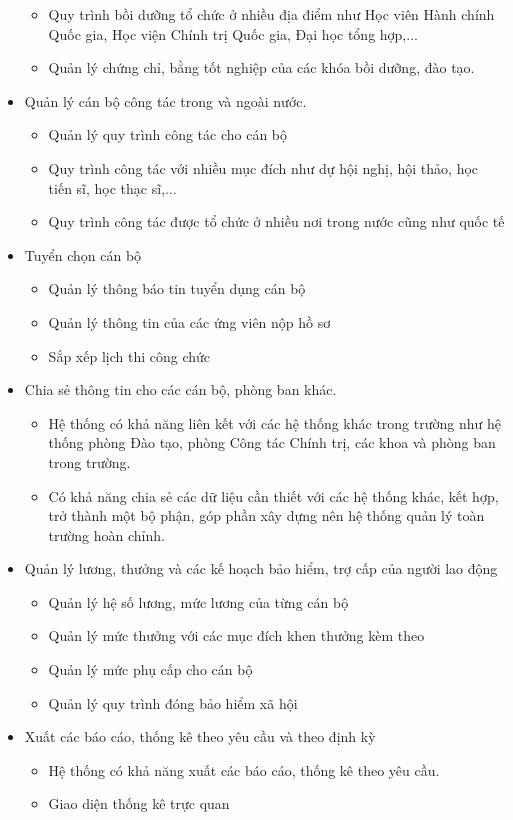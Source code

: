 \begin{itemize}
\begin{itemize}
        \item Quy trình bồi dưỡng tổ chức ở nhiều địa điểm như Học viên Hành chính Quốc gia, Học viện Chính trị Quốc gia, Đại học tổng hợp,...
        \item Quản lý chứng chỉ, bằng tốt nghiệp của các khóa bồi dưỡng, đào tạo.
    \end{itemize}
    \item Quản lý cán bộ công tác trong và ngoài nước.
    \begin{itemize}
        \item Quản lý quy trình công tác cho cán bộ
        \item Quy trình công tác với nhiều mục đích như dự hội nghị, hội thảo, học tiến sĩ, học thạc sĩ,...
        \item Quy trình công tác được tổ chức ở nhiều nơi trong nước cũng như quốc tế
    \end{itemize}
    \item Tuyển chọn cán bộ
    \begin{itemize}
        \item Quản lý thông báo tin tuyển dụng cán bộ
        \item Quản lý thông tin của các ứng viên nộp hồ sơ
        \item Sắp xếp lịch thi công chức
    \end{itemize}
    \item Chia sẻ thông tin cho các cán bộ, phòng ban khác.
    \begin{itemize}
        \item Hệ thống có khả năng liên kết với các hệ thống khác trong trường như hệ thống phòng Đào tạo, phòng Công tác Chính trị, các khoa và phòng ban trong trường.
        \item Có khả năng chia sẻ các dữ liệu cần thiết với các hệ thống khác, kết hợp, trở thành một bộ phận, góp phần xây dựng nên hệ thống quản lý toàn trường hoàn chỉnh.
    \end{itemize}
    \item Quản lý lương, thưởng và các kế hoạch bảo hiểm, trợ cấp của người lao động
    \begin{itemize}
        \item Quản lý hệ số lương, mức lương của từng cán bộ
        \item Quản lý mức thưởng với các mục đích khen thưởng kèm theo
        \item Quản lý mức phụ cấp cho cán bộ
        \item Quản lý quy trình đóng bảo hiểm xã hội
    \end{itemize}
    \item Xuất các báo cáo, thống kê theo yêu cầu và theo định kỳ
    \begin{itemize}
        \item Hệ thống có khả năng xuất các báo cáo, thống kê theo yêu cầu.
        \item Giao diện thống kê trực quan
    \end{itemize}
\end{itemize}
